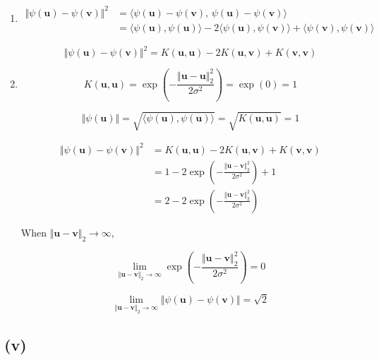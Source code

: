 \documentclass[11pt]{article}
\begin{document}
\begin{enumerate}
    \item[1. ]
    $$
    \begin{aligned}
        \Vert \psi(\mathbf{u}) - \psi(\mathbf{v})\Vert ^2
        &= \langle \psi(\mathbf{u}) - \psi(\mathbf{v}), \, \psi(\mathbf{u}) - \psi(\mathbf{v}) \rangle \\
        &= \langle \psi(\mathbf{u}), \psi(\mathbf{u}) \rangle - 2 \langle \psi(\mathbf{u}), \psi(\mathbf{v}) \rangle + \langle \psi(\mathbf{v}), \psi(\mathbf{v}) \rangle
    \end{aligned}
    $$

    $$
    \Vert \psi(\mathbf{u}) - \psi(\mathbf{v})\Vert ^2 = K(\mathbf{u}, \mathbf{u}) - 2K(\mathbf{u}, \mathbf{v}) + K(\mathbf{v}, \mathbf{v})
    $$

    \item[2. ]

    $$
    K(\mathbf{u}, \mathbf{u})
    = \exp\left(-\frac{\Vert \mathbf{u} - \mathbf{u}\Vert _2^2}{2\sigma^2}\right)
    = \exp(0)
    = 1
    $$

    $$
    \Vert \psi(\mathbf{u})\Vert 
    = \sqrt{\langle \psi(\mathbf{u}), \psi(\mathbf{u}) \rangle}
    = \sqrt{K(\mathbf{u}, \mathbf{u})}
    = 1
    $$

    $$
    \begin{aligned}
        \Vert \psi(\mathbf{u}) - \psi(\mathbf{v})\Vert ^2
        &= K(\mathbf{u}, \mathbf{u}) - 2K(\mathbf{u}, \mathbf{v}) + K(\mathbf{v}, \mathbf{v}) \\
        &= 1 - 2\exp\left(-\frac{\Vert \mathbf{u} - \mathbf{v}\Vert _2^2}{2\sigma^2}\right) + 1 \\
        &= 2 - 2\exp\left(-\frac{\Vert \mathbf{u} - \mathbf{v}\Vert _2^2}{2\sigma^2}\right)
    \end{aligned}
    $$

    When $\Vert \mathbf{u} - \mathbf{v}\Vert _2 \to \infty$, 

    $$
    \lim_{\Vert \mathbf{u} - \mathbf{v}\Vert _2 \to \infty} \exp\left(-\frac{\Vert \mathbf{u} - \mathbf{v}\Vert _2^2}{2\sigma^2}\right) = 0
    $$

    $$
    \lim_{\Vert \mathbf{u} - \mathbf{v}\Vert _2 \to \infty} \Vert \psi(\mathbf{u}) - \psi(\mathbf{v})\Vert  = \sqrt{2}
    $$
\end{enumerate}

\subsection*{(v)}
\end{document}
